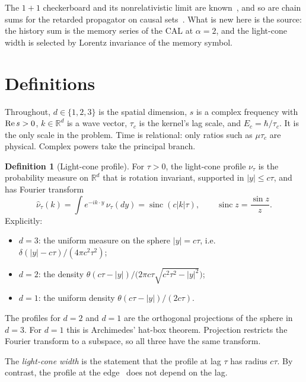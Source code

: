 \documentclass[11pt]{amsart}
\theoremstyle{definition}
\newtheorem{definition}[theorem]{Definition}
\theoremstyle{remark}
\newcommand{\sinc}{\operatorname{sinc}}
\begin{document}
The $1+1$ checkerboard and its nonrelativistic limit are known~\cite{FH,JS,GJKS}, and so are chain sums for the retarded propagator on causal sets~\cite{Johnston}. What is new here is the source: the history sum is the memory series of the CAL at $\alpha=2$, and the light-cone width is selected by Lorentz invariance of the memory symbol.

\section{Definitions}

Throughout, $d\in\{1,2,3\}$ is the spatial dimension, $s$ is a complex frequency with ${\rm Re}\,s>0$, $k\in\mathbb R^d$ is a wave vector, $\tau_c$ is the kernel's lag scale, and $E_c=\hbar/\tau_c$. It is the only scale in the problem. Time is relational: only ratios such as $\mu\tau_c$ are physical. Complex powers take the principal branch.

\begin{definition}[Light-cone profile]\label{def:profile}
For $\tau>0$, the light-cone profile $\nu_\tau$ is the probability measure on $\mathbb R^d$ that is rotation invariant, supported in $\lvert y\rvert\le c\tau$, and has Fourier transform
\[
\hat\nu_\tau(k)=\int e^{-ik\cdot y}\,\nu_\tau(dy)=\sinc(c\lvert k\rvert\tau),\qquad \sinc z=\frac{\sin z}{z}.
\]
Explicitly:
\begin{itemize}
\item $d=3$: the uniform measure on the sphere $\lvert y\rvert=c\tau$, i.e.\ $\delta(\lvert y\rvert-c\tau)/(4\pi c^2\tau^2)$;
\item $d=2$: the density $\theta(c\tau-\lvert y\rvert)\big/\big(2\pi c\tau\sqrt{c^2\tau^2-\lvert y\rvert^2}\big)$;
\item $d=1$: the uniform density $\theta(c\tau-\lvert y\rvert)/(2c\tau)$.
\end{itemize}
The profiles for $d=2$ and $d=1$ are the orthogonal projections of the sphere in $d=3$. For $d=1$ this is Archimedes' hat-box theorem. Projection restricts the Fourier transform to a subspace, so all three have the same transform.

The \emph{light-cone width} is the statement that the profile at lag $\tau$ has radius $c\tau$. By contrast, the profile at the edge~\cite[Def.~2.2]{Edge} does not depend on the lag.
\end{definition}
\end{document}
